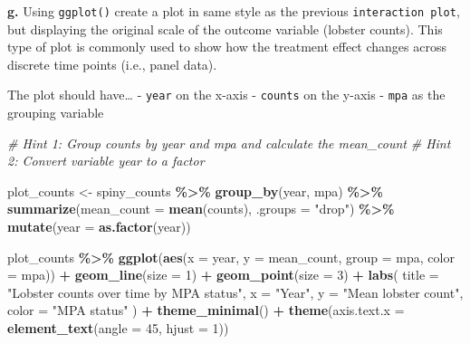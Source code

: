 \documentclass[
]{article}
\newenvironment{Shaded}{\begin{snugshade}}{\end{snugshade}}
\newcommand{\AttributeTok}[1]{\textcolor[rgb]{0.13,0.29,0.53}{#1}}
\newcommand{\CommentTok}[1]{\textcolor[rgb]{0.56,0.35,0.01}{\textit{#1}}}
\newcommand{\DecValTok}[1]{\textcolor[rgb]{0.00,0.00,0.81}{#1}}
\newcommand{\FunctionTok}[1]{\textcolor[rgb]{0.13,0.29,0.53}{\textbf{#1}}}
\newcommand{\NormalTok}[1]{#1}
\newcommand{\OtherTok}[1]{\textcolor[rgb]{0.56,0.35,0.01}{#1}}
\newcommand{\SpecialCharTok}[1]{\textcolor[rgb]{0.81,0.36,0.00}{\textbf{#1}}}
\newcommand{\StringTok}[1]{\textcolor[rgb]{0.31,0.60,0.02}{#1}}
\begin{document}
\textbf{g.} Using \texttt{ggplot()} create a plot in same style as the
previous \texttt{interaction\ plot}, but displaying the original scale
of the outcome variable (lobster counts). This type of plot is commonly
used to show how the treatment effect changes across discrete time
points (i.e., panel data).

The plot should have\ldots{} - \texttt{year} on the x-axis -
\texttt{counts} on the y-axis - \texttt{mpa} as the grouping variable

\begin{Shaded}
\begin{Highlighting}[]
\CommentTok{\# Hint 1: Group counts by \textasciigrave{}year\textasciigrave{} and \textasciigrave{}mpa\textasciigrave{} and calculate the \textasciigrave{}mean\_count\textasciigrave{}}
\CommentTok{\# Hint 2: Convert variable \textasciigrave{}year\textasciigrave{} to a factor}

\NormalTok{plot\_counts }\OtherTok{\textless{}{-}}\NormalTok{ spiny\_counts }\SpecialCharTok{\%\textgreater{}\%}
  \FunctionTok{group\_by}\NormalTok{(year, mpa) }\SpecialCharTok{\%\textgreater{}\%}
  \FunctionTok{summarize}\NormalTok{(}\AttributeTok{mean\_count =} \FunctionTok{mean}\NormalTok{(counts), }\AttributeTok{.groups =} \StringTok{"drop"}\NormalTok{) }\SpecialCharTok{\%\textgreater{}\%}
  \FunctionTok{mutate}\NormalTok{(}\AttributeTok{year =} \FunctionTok{as.factor}\NormalTok{(year))  }

\NormalTok{plot\_counts }\SpecialCharTok{\%\textgreater{}\%} \FunctionTok{ggplot}\NormalTok{(}\FunctionTok{aes}\NormalTok{(}\AttributeTok{x =}\NormalTok{ year, }
                           \AttributeTok{y =}\NormalTok{ mean\_count, }
                           \AttributeTok{group =}\NormalTok{ mpa, }\AttributeTok{color =}\NormalTok{ mpa)) }\SpecialCharTok{+}
  \FunctionTok{geom\_line}\NormalTok{(}\AttributeTok{size =} \DecValTok{1}\NormalTok{) }\SpecialCharTok{+}  
  \FunctionTok{geom\_point}\NormalTok{(}\AttributeTok{size =} \DecValTok{3}\NormalTok{) }\SpecialCharTok{+}
  \FunctionTok{labs}\NormalTok{(}
    \AttributeTok{title =} \StringTok{"Lobster counts over time by MPA status"}\NormalTok{,}
    \AttributeTok{x =} \StringTok{"Year"}\NormalTok{,}
    \AttributeTok{y =} \StringTok{"Mean lobster count"}\NormalTok{,}
    \AttributeTok{color =} \StringTok{"MPA status"}
\NormalTok{  ) }\SpecialCharTok{+}
  \FunctionTok{theme\_minimal}\NormalTok{() }\SpecialCharTok{+} 
  \FunctionTok{theme}\NormalTok{(}\AttributeTok{axis.text.x =} \FunctionTok{element\_text}\NormalTok{(}\AttributeTok{angle =} \DecValTok{45}\NormalTok{, }\AttributeTok{hjust =} \DecValTok{1}\NormalTok{)) }
\end{Highlighting}
\end{Shaded}
\end{document}
